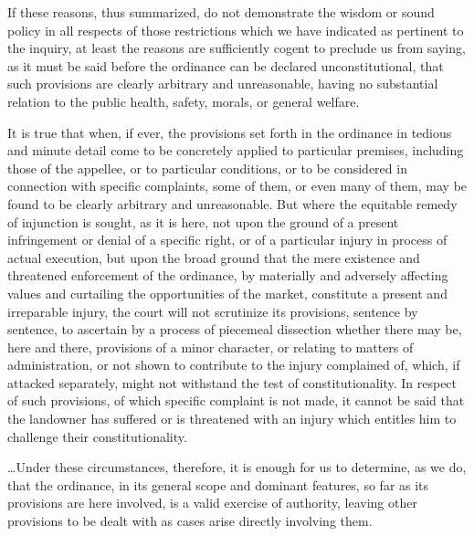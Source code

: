 If these reasons, thus summarized, do not demonstrate the wisdom or sound policy
in all respects of those restrictions which we have indicated as pertinent to
the inquiry, at least the reasons are sufficiently cogent to preclude us from
saying, as it must be said before the ordinance can be declared
unconstitutional, that such provisions are clearly arbitrary and unreasonable,
having no substantial relation to the public health, safety, morals, or general
welfare. 

It is true that when, if ever, the provisions set forth in the ordinance in
tedious and minute detail come to be concretely applied to particular premises,
including those of the appellee, or to particular conditions, or to be
considered in connection with specific complaints, some of them, or even many of
them, may be found to be clearly arbitrary and unreasonable. But where the
equitable remedy of injunction is sought, as it is here, not upon the ground of
a present infringement or denial of a specific right, or of a particular injury
in process of actual execution, but upon the broad ground that the mere
existence and threatened enforcement of the ordinance, by materially and
adversely affecting values and curtailing the opportunities of the market,
constitute a present and irreparable injury, the court will not scrutinize its
provisions, sentence by sentence, to ascertain by a process of piecemeal
dissection whether there may be, here and there, provisions of a minor
character, or relating to matters of administration, or not shown to contribute
to the injury complained of, which, if attacked separately, might not withstand
the test of constitutionality. In respect of such provisions, of which specific
complaint is not made, it cannot be said that the landowner has suffered or is
threatened with an injury which entitles him to challenge their
constitutionality. 

\ldots Under these circumstances, therefore, it is enough for us to determine,
as we do, that the ordinance, in its general scope and dominant features, so far
as its provisions are here involved, is a valid exercise of authority, leaving
other provisions to be dealt with as cases arise directly involving them.

